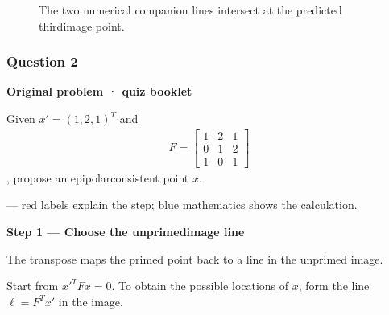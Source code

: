 \documentclass[letterpaper,11pt,english,openany,oneside]{jupyterBook}
\begin{document}
\par

\begin{figure}[H]
\centering
\capstart

\noindent{}
\caption{The two numerical companion lines intersect at the predicted third\sphinxhyphen{}image point.}\label{\detokenize{lectures/lecture04/quiz-workbook:id8}}\end{figure}


\subsubsection{Question 2}
\label{\detokenize{lectures/lecture04/quiz-workbook:question-2}}\label{\detokenize{lectures/lecture04/quiz-workbook:quiz-3-q2}}\label{\detokenize{lectures/lecture04/quiz-workbook:ex-lec04-invalid-f}}
\par\medskip\textbf{Original problem · quiz booklet}\par\smallskip

\sphinxAtStartPar
Given \(x'=(1,2,1)^T\) and
\begin{equation*}
\begin{split}
F=\begin{bmatrix}1&2&1\\0&1&2\\1&0&1\end{bmatrix}
\end{split}
\end{equation*}
\sphinxAtStartPar
, propose an epipolar\sphinxhyphen{}consistent point \(x\).

\par\medskip

\sphinxAtStartPar
{} — red labels explain the step; blue mathematics shows the calculation.

\par\medskip{}
{\color{QuizStepRed}\bfseries Step 1 — Choose the unprimed\sphinxhyphen{}image line}\par\smallskip

\sphinxAtStartPar
{} The transpose maps the primed point back to a line in the unprimed image.

\sphinxAtStartPar
Start from {\color{QuizMathBlue} \(\boxed{x'^TFx=0}\)}. To obtain the possible locations of {\color{QuizMathBlue} \(x\)}, form the line {\color{QuizMathBlue} \(\ell=F^Tx'\)} in the  image.
\end{document}
